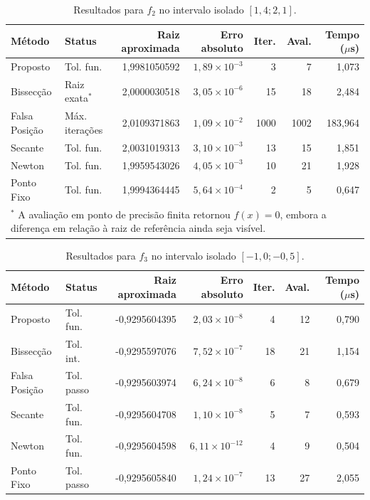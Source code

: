 \documentclass[12pt,a4paper]{article}
\begin{document}
\begin{table}[H]
\centering
\caption{Resultados para $f_2$ no intervalo isolado $[1,4;2,1]$.}
\label{tab:f2}
\small
\begin{tabular}{l l r r r r r}
\toprule
Método & Status & Raiz aproximada & Erro absoluto & Iter. & Aval. & Tempo ($\mu$s) \\
\midrule
Proposto & Tol. fun. & 1,9981050592 & $1,89\times10^{-3}$ & 3 & 7 & 1,073 \\
Bissecção & Raiz exata$^*$ & 2,0000030518 & $3,05\times10^{-6}$ & 15 & 18 & 2,484 \\
Falsa Posição & Máx. iterações & 2,0109371863 & $1,09\times10^{-2}$ & 1000 & 1002 & 183,964 \\
Secante & Tol. fun. & 2,0031019313 & $3,10\times10^{-3}$ & 13 & 15 & 1,851 \\
Newton & Tol. fun. & 1,9959543026 & $4,05\times10^{-3}$ & 10 & 21 & 1,928 \\
Ponto Fixo & Tol. fun. & 1,9994364445 & $5,64\times10^{-4}$ & 2 & 5 & 0,647 \\
\bottomrule
\multicolumn{7}{p{14cm}}{\footnotesize $^*$ A avaliação em ponto de precisão finita retornou $f(x)=0$, embora a diferença em relação à raiz de referência ainda seja visível.}
\end{tabular}
\end{table}

\begin{table}[H]
\centering
\caption{Resultados para $f_3$ no intervalo isolado $[-1,0;-0,5]$.}
\label{tab:f3}
\small
\begin{tabular}{l l r r r r r}
\toprule
Método & Status & Raiz aproximada & Erro absoluto & Iter. & Aval. & Tempo ($\mu$s) \\
\midrule
Proposto & Tol. fun. & -0,9295604395 & $2,03\times10^{-8}$ & 4 & 12 & 0,790 \\
Bissecção & Tol. int. & -0,9295597076 & $7,52\times10^{-7}$ & 18 & 21 & 1,154 \\
Falsa Posição & Tol. passo & -0,9295603974 & $6,24\times10^{-8}$ & 6 & 8 & 0,679 \\
Secante & Tol. fun. & -0,9295604708 & $1,10\times10^{-8}$ & 5 & 7 & 0,593 \\
Newton & Tol. fun. & -0,9295604598 & $6,11\times10^{-12}$ & 4 & 9 & 0,504 \\
Ponto Fixo & Tol. passo & -0,9295605840 & $1,24\times10^{-7}$ & 13 & 27 & 2,055 \\
\bottomrule
\end{tabular}
\end{table}
\end{document}
